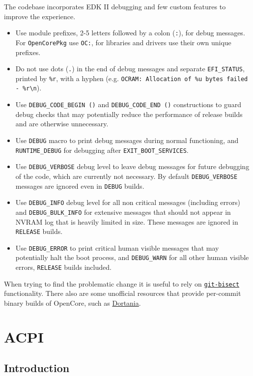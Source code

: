 \documentclass[]{article}
\providecommand{\tightlist}{%
  \setlength{\itemsep}{0pt}\setlength{\parskip}{0pt}}
\begin{document}
The codebase incorporates EDK II debugging and few custom features to improve the experience.
\begin{itemize}
\tightlist
\item Use module prefixes, 2-5 letters followed by a colon (\texttt{:}), for debug messages. For \texttt{OpenCorePkg}
use \texttt{OC:}, for libraries and drivers use their own unique prefixes.
\item Do not use dots (\texttt{.}) in the end of debug messages and separate \texttt{EFI\_STATUS}, printed by
\texttt{\%r}, with a hyphen (e.g. \texttt{OCRAM: Allocation of \%u bytes failed - \%r\textbackslash n}).
\item Use \texttt{DEBUG\_CODE\_BEGIN ()} and \texttt{DEBUG\_CODE\_END ()} constructions to guard debug checks
that may potentially reduce the performance of release builds and are otherwise unnecessary.
\item Use \texttt{DEBUG} macro to print debug messages during normal functioning, and \texttt{RUNTIME\_DEBUG} for
debugging after \texttt{EXIT\_BOOT\_SERVICES}.
\item Use \texttt{DEBUG\_VERBOSE} debug level to leave debug messages for future debugging of the code, which
are currently not necessary. By default \texttt{DEBUG\_VERBOSE} messages are ignored even in \texttt{DEBUG} builds.
\item Use \texttt{DEBUG\_INFO} debug level for all non critical messages (including errors) and \texttt{DEBUG\_BULK\_INFO}
for extensive messages that should not appear in NVRAM log that is heavily limited in size. These messages are ignored in
\texttt{RELEASE} builds.
\item Use \texttt{DEBUG\_ERROR} to print critical human visible messages that may potentially halt the boot process, and
\texttt{DEBUG\_WARN} for all other human visible errors, \texttt{RELEASE} builds included.
\end{itemize}

When trying to find the problematic change it is useful to rely on
\href{https://git-scm.com/docs/git-bisect}{\texttt{git-bisect}} functionality.
There also are some unofficial resources that provide per-commit binary
builds of OpenCore, such as \href{https://dortania.github.io/builds}{Dortania}.

\section{ACPI}\label{acpi}

\subsection{Introduction}\label{acpiintro}
\end{document}
